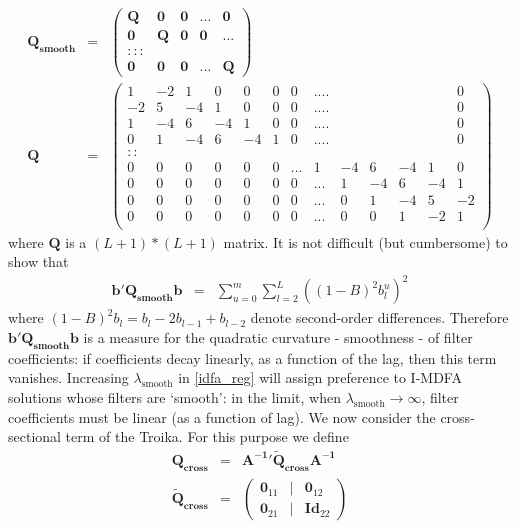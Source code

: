 \documentclass[11pt]{article}
\begin{document}
\begin{eqnarray*}
\mathbf{Q_{smooth}}&=&\left(\begin{array}{ccccc}
\mathbf{Q}&\mathbf{0}&\mathbf{0}&...&\mathbf{0}\\
\mathbf{0}&\mathbf{Q}&\mathbf{0}&\mathbf{0}&...\\
:::\\
\mathbf{0}&\mathbf{0}&\mathbf{0}&...&\mathbf{Q}
\end{array}\right)\\
\mathbf{Q}&=&\left(\begin{array}{ccccccccccccc}
1 &-2&1 &  0&0&0 &0&....&  &   &   &   &  0\\
-2& 5&-4&1 &0&0 &0&....&  &   &   &   &  0\\
1 &-4& 6&-4&1&0 &0&....&  &   &   &   &  0\\
0 &1 &-4& 6&-4&1&0&....&  &   &   &   &  0\\
::\\
0 & 0& 0&0&0 &0&...&1 &-4& 6&-4& 1& 0\\
0 &0 & 0& 0&0&0 &0&...&1 &-4& 6&-4& 1\\
0 &0 & 0& 0&0&0 &0&...&0 & 1 &-4& 5&-2\\
0 &0 & 0& 0&0&0 &0&...&0 & 0 &1 &-2&1  \\
\end{array}\right)
\end{eqnarray*}
where $\mathbf{Q}$ is a $(L+1)*(L+1)$ matrix. It is not difficult (but cumbersome) to show that 
\begin{eqnarray}
\mathbf{b'Q_{smooth}b}&=&\sum_{u=0}^m\sum_{l=2}^{L}\left((1-B)^2 b_l^u\right)^2
\end{eqnarray}
where $(1-B)^2 b_l=b_l-2b_{l-1}+b_{l-2}$ denote second-order differences. Therefore $\mathbf{b'Q_{smooth}b}$  is a measure for the quadratic curvature - smoothness - of filter coefficients: if coefficients decay linearly, as a function of the lag, then this term vanishes. Increasing $\lambda_{\textrm{smooth}}$ in \ref{idfa_reg} will assign preference to I-MDFA solutions whose filters are `smooth': in the limit, when $\lambda_{\textrm{smooth}}\to \infty$, filter coefficients must be linear (as a function of lag). We now consider the cross-sectional term of the Troika. For this purpose we define
\begin{eqnarray}
\mathbf{Q_{cross}}&=&\mathbf{A^{-1}}'\mathbf{\tilde{Q}_{cross}}\mathbf{A^{-1}}\nonumber\\
\mathbf{\tilde{Q}_{cross}}&=&\left(\begin{array}{ccc}
\mathbf{0}_{11}&|&\mathbf{0}_{12}\\
\mathbf{0}_{21}&|&\mathbf{Id}_{22}
\end{array}\right)\label{Qtildecross}
\end{eqnarray}
\end{document}
